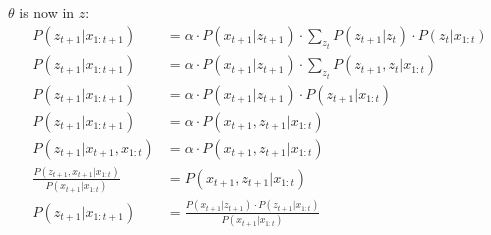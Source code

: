 \documentclass{article}
\begin{document}
$\theta$ is now in $z$:
\begin{align}
    P(z_{t+1} | x_{1:t+1}) &= \alpha \cdot P(x_{t+1} | z_{t+1}) \cdot \sum_{z_t}P(z_{t+1}|z_{t}) \cdot P(z_{t} | x_{1:t})
\\
    P(z_{t+1} | x_{1:t+1}) &= \alpha \cdot P(x_{t+1} | z_{t+1}) \cdot \sum_{z_t} P(z_{t+1}, z_t | x_{1:t})
\\
    P(z_{t+1} | x_{1:t+1}) &= \alpha \cdot P(x_{t+1} | z_{t+1}) \cdot P(z_{t+1} | x_{1:t})
\\
    P(z_{t+1} | x_{1:t+1}) &= \alpha \cdot P(x_{t+1}, z_{t+1} | x_{1:t})
\\
    P(z_{t+1} | x_{t+1}, x_{1:t}) &= \alpha \cdot P(x_{t+1}, z_{t+1} | x_{1:t})
\\
    \frac{P(z_{t+1} , x_{t+1} | x_{1:t})}{P(x_{t+1} | x_{1:t})} &= P(x_{t+1}, z_{t+1} | x_{1:t})
\\
    P(z_{t+1} | x_{1:t+1}) &= \frac{P(x_{t+1}| z_{t+1}) \cdot P(z_{t+1} | x_{1:t})}{P(x_{t+1} | x_{1:t})}
\end{align}
\end{document}
